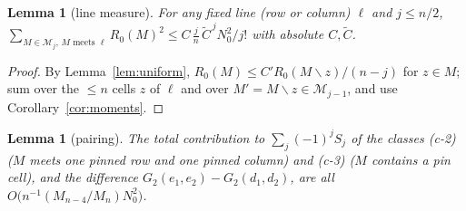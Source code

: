 \documentclass[11pt]{article}
\newtheorem{lemma}[theorem]{Lemma}
\theoremstyle{definition}
\begin{document}
\begin{lemma}[line measure]\label{lem:linemeasure}
For any fixed line (row or column) $\ell$ and $j\le n/2$,
$\sum_{M\in\mathcal M_j,\,M\text{ meets }\ell}R_0(M)^2
\le C\,\tfrac{j}{n}\,\tilde C^{\,j}N_0^2/j!$ with absolute $C,\tilde C$.
\end{lemma}

\begin{proof}
By Lemma~\ref{lem:uniform}, $R_0(M)\le C'R_0(M\smallsetminus z)/(n-j)$
for $z\in M$; sum over the $\le n$ cells $z$ of $\ell$ and over
$M'=M\smallsetminus z\in\mathcal M_{j-1}$, and use
Corollary~\ref{cor:moments}.
\end{proof}

\begin{lemma}[pairing]\label{lem:pairing}
The total contribution to $\sum_j(-1)^jS_j$ of the classes
\textup{(c-2)} ($M$ meets one pinned row and one pinned column) and
\textup{(c-3)} ($M$ contains a pin cell), and the difference
$G_2(e_1,e_2)-G_2(d_1,d_2)$, are all
$O\bigl(n^{-1}(M_{n-4}/M_n)N_0^2\bigr)$.
\end{lemma}
\end{document}
